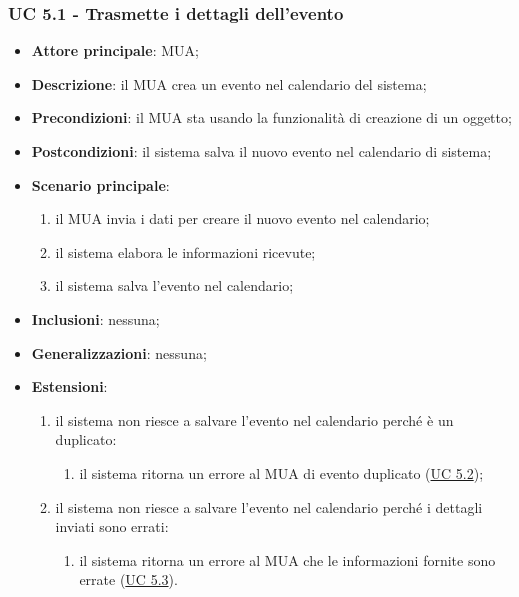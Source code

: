 \subsubsection{UC 5.1 - Trasmette i dettagli dell'evento} \label{sec:UC5.1}
    \begin{itemize}
        \item \textbf{Attore principale}: MUA;
        \item \textbf{Descrizione}: il MUA crea un evento nel calendario del sistema;
        \item \textbf{Precondizioni}: il MUA sta usando la funzionalità di creazione di un oggetto;
        \item \textbf{Postcondizioni}: il sistema salva il nuovo evento nel calendario di sistema;
        \item \textbf{Scenario principale}:
            \begin{enumerate}
                \item il MUA invia i dati per creare il nuovo evento nel calendario;
                \item il sistema elabora le informazioni ricevute;
                \item il sistema salva l'evento nel calendario;
            \end{enumerate}
        \item \textbf{Inclusioni}: nessuna;
        \item \textbf{Generalizzazioni}: nessuna;
        \item \textbf{Estensioni}:
            \begin{enumerate}[label=\alph*.]
                \item il sistema non riesce a salvare l'evento nel calendario perché è un duplicato:
                \begin{enumerate}[label=\arabic*.]
                    \item il sistema ritorna un errore al MUA di evento duplicato (\hyperref[sec:UC5.2]{UC 5.2});
                \end{enumerate}
                \item il sistema non riesce a salvare l'evento nel calendario perché i dettagli inviati sono errati:
                \begin{enumerate}[label=\arabic*.]
                    \item il sistema ritorna un errore al MUA che le informazioni fornite sono errate (\hyperref[sec:UC5.3]{UC 5.3}).
                \end{enumerate}
            \end{enumerate}
    \end{itemize}

